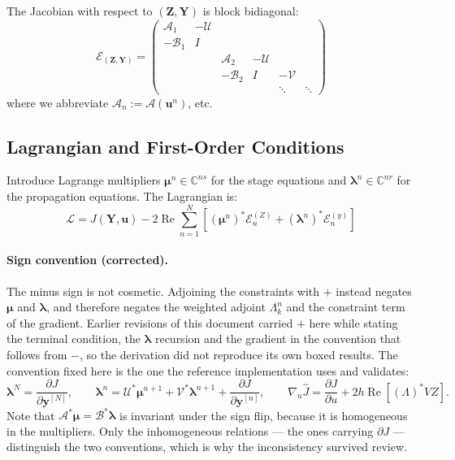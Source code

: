 \documentclass[11pt]{article}
\newcommand{\LL}{\mathcal{L}}
\newcommand{\CC}{\mathbb{C}}
\newcommand{\herm}{^\ast}
\renewcommand{\Re}{\operatorname{Re}}
\newcommand{\pder}[2]{\frac{\partial #1}{\partial #2}}
\newcommand{\yv}{\mathbf{y}}
\newcommand{\uv}{\mathbf{u}}
\newcommand{\lv}{\boldsymbol{\lambda}}
\newcommand{\mv}{\boldsymbol{\mu}}
\newcommand{\Av}{\mathcal{A}}
\newcommand{\Bv}{\mathcal{B}}
\newcommand{\Uv}{\mathcal{U}}
\newcommand{\Vv}{\mathcal{V}}
\begin{document}
The Jacobian with respect to $(\mathbf{Z}, \mathbf{Y})$ is block bidiagonal:
\begin{equation}
\mathcal{E}_{(\mathbf{Z},\mathbf{Y})} = 
\begin{pmatrix}
\Av_1 & -\Uv & & & & \\
-\Bv_1 & I & & & & \\
& & \Av_2 & -\Uv & & \\
& & -\Bv_2 & I & -\Vv & \\
& & & & \ddots & \ddots
\end{pmatrix}
\end{equation}
where we abbreviate $\Av_n := \Av(\uv^n)$, etc.

\subsection{Lagrangian and First-Order Conditions}

Introduce Lagrange multipliers $\mv^n \in \CC^{ns}$ for the stage equations and $\lv^n \in \CC^{nr}$ for the propagation equations. The Lagrangian is:
\begin{equation}
\label{eqn:glm_lagrangian}
\LL = J(\mathbf{Y}, \mathbf{u}) - 2\Re\sum_{n=1}^N \left[ (\mv^n)\herm \mathcal{E}^{(Z)}_n + (\lv^n)\herm \mathcal{E}^{(y)}_n \right]
\end{equation}

\paragraph{Sign convention (corrected).}
The minus sign is not cosmetic. Adjoining the constraints with $+$ instead
negates $\mv$ and $\lv$, and therefore negates the weighted adjoint
$\Lambda_k^n$ and the constraint term of the gradient. Earlier revisions of this
document carried $+$ here while stating the terminal condition, the $\lv$
recursion and the gradient in the convention that follows from $-$, so the
derivation did not reproduce its own boxed results. The convention fixed here is
the one the reference implementation uses and validates:
\[
  \lv^N = \pder{J}{\yv^{[N]}}, \qquad
  \lv^n = \Uv\herm \mv^{n+1} + \Vv\herm \lv^{n+1} + \pder{J}{\yv^{[n]}}, \qquad
  \nabla_{u} \hat J = \pder{J}{u} + 2h\Re\!\left[ (\Lambda)\herm V Z \right].
\]
Note that $\Av\herm \mv = \Bv\herm \lv$ is invariant under the sign flip,
because it is homogeneous in the multipliers. Only the inhomogeneous
relations --- the ones carrying $\partial J$ --- distinguish the two
conventions, which is why the inconsistency survived review.
\end{document}
